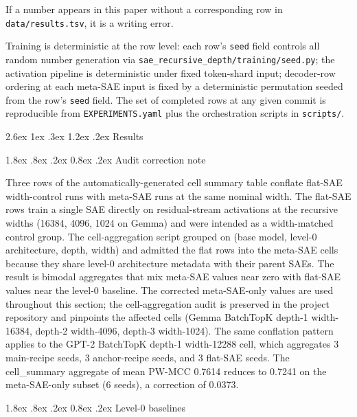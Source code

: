 \documentclass[conference]{IEEEtran}
\makeatletter
\renewcommand\section{\@startsection{section}{1}{\z@}%
   {2.6ex \@plus 1ex \@minus .3ex}%
   {1.2ex \@plus .2ex}%
   {\normalfont\Large\bfseries\centering}}
\renewcommand\subsection{\@startsection{subsection}{2}{\z@}%
   {1.8ex \@plus .8ex \@minus .2ex}%
   {0.8ex \@plus .2ex}%
   {\normalfont\large\bfseries}}
\makeatother
\begin{document}
If a number appears in this paper without a corresponding row in
\texttt{data/results.tsv}, it is a writing error.

Training is deterministic at the row level: each row's \texttt{seed}
field controls all random number generation via
\texttt{sae\_recursive\_depth/training/seed.py}; the activation pipeline
is deterministic under fixed token-shard input; decoder-row ordering at
each meta-SAE input is fixed by a deterministic permutation seeded from
the row's \texttt{seed} field. The set of completed rows at any given
commit is reproducible from \texttt{EXPERIMENTS.yaml} plus the
orchestration scripts in \texttt{scripts/}.

\hypertarget{results}{%
\section{Results}\label{results}}

\hypertarget{a.-audit-correction-note}{%
\subsection{Audit correction note}\label{a.-audit-correction-note}}

Three rows of the automatically-generated cell summary table conflate
flat-SAE width-control runs with meta-SAE runs at the same nominal
width. The flat-SAE rows train a single SAE directly on residual-stream
activations at the recursive widths (16384, 4096, 1024 on Gemma) and
were intended as a width-matched control group. The cell-aggregation
script grouped on (base model, level-0 architecture, depth, width) and
admitted the flat rows into the meta-SAE cells because they share
level-0 architecture metadata with their parent SAEs. The result is
bimodal aggregates that mix meta-SAE values near zero with flat-SAE
values near the level-0 baseline. The corrected meta-SAE-only values are
used throughout this section; the cell-aggregation audit is preserved in
the project repository and pinpoints the affected cells (Gemma BatchTopK
depth-1 width-16384, depth-2 width-4096, depth-3 width-1024). The same
conflation pattern applies to the GPT-2 BatchTopK depth-1 width-12288
cell, which aggregates 3 main-recipe seeds, 3 anchor-recipe seeds, and 3
flat-SAE seeds. The cell\_summary aggregate of mean PW-MCC 0.7614
reduces to 0.7241 on the meta-SAE-only subset (6 seeds), a correction of
0.0373.

\hypertarget{b.-level-0-baselines}{%
\subsection{Level-0 baselines}\label{b.-level-0-baselines}}
\end{document}
